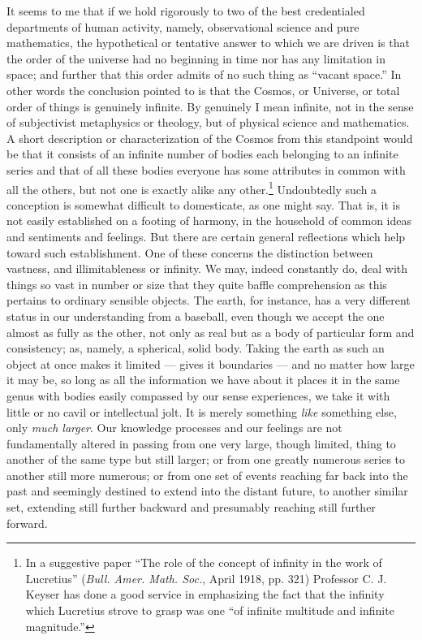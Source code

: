 \documentclass[a4paper, 11pt, oneside, polutonikogreek, english, landscape]{article}
\begin{document}
It seems to me that if we hold rigorously to two of the best credentialed departments of human activity, namely, observational science and pure mathematics, the hypothetical or tentative answer to which we are driven is that the order of the universe had no beginning in time nor has any limitation in space; and further that this order admits of no such thing as ``vacant space.'' In other words the conclusion pointed to is that the Cosmos, or Universe, or total order of things is genuinely infinite. By genuinely I mean infinite, not in the sense of subjectivist metaphysics or theology, but of physical science and mathematics. A short description or characterization of the Cosmos from this standpoint would be that it consists of an infinite number of bodies each belonging to an infinite series and that of all these bodies everyone has some attributes in common with all the others, but not one is exactly alike any other.\footnote{In a suggestive paper ``The role of the concept of infinity in the work of Lucretius'' (\emph{Bull. Amer. Math. Soc.}, April 1918, pp. 321) Professor C. J. Keyser has done a good service in emphasizing the fact that the infinity which Lucretius strove to grasp was one ``of infinite multitude and infinite magnitude.''} Undoubtedly such a conception is somewhat difficult to domesticate, as one might say. That is, it is not easily established on a footing of harmony, in the household of common ideas and sentiments and feelings. But there are certain general reflections which help toward such establishment. One of these concerns the distinction between vastness, and illimitableness or infinity. We may, indeed constantly do, deal with things so vast in number or size that they quite baffle comprehension as this pertains to ordinary sensible objects. The earth, for instance, has a very different status in our understanding from a baseball, even though we accept the one almost as fully as the other, not only as real but as a body of particular form and consistency; as, namely, a spherical, solid body. Taking the earth as such an object at once makes it limited --- gives it boundaries --- and no matter how large it may be, so long as all the information we have about it places it in the same genus with bodies easily compassed by our sense experiences, we take it with little or no cavil or intellectual jolt. It is merely something \emph{like} something else, only \emph{much larger}. Our knowledge processes and our feelings are not fundamentally altered in passing from one very large, though limited, thing to another of the same type but still larger; or from one greatly numerous series to another still more numerous; or from one set of events reaching far back into the past and seemingly destined to extend into the distant future, to another similar set, extending still further backward and presumably reaching still further forward.
\end{document}
